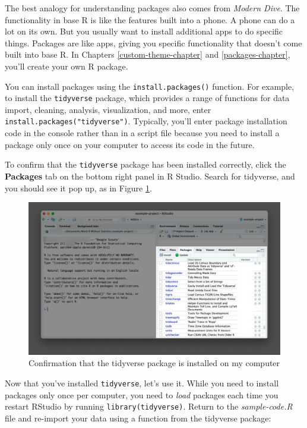 \documentclass[
]{book}
\begin{document}
The best analogy for understanding packages also comes from \emph{Modern Dive}. The functionality in base R is like the features built into a phone. A phone can do a lot on its own. But you usually want to install additional apps to do specific things. Packages are like apps, giving you specific functionality that doesn't come built into base R. In Chapters \ref{custom-theme-chapter} and \ref{packages-chapter}, you'll create your own R package.

You can install packages using the \texttt{install.packages()} function. For example, to install the \texttt{tidyverse} package, which provides a range of functions for data import, cleaning, analysis, visualization, and more, enter \texttt{install.packages("tidyverse")}. Typically, you'll enter package installation code in the console rather than in a script file because you need to install a package only once on your computer to access its code in the future.

To confirm that the \texttt{tidyverse} package has been installed correctly, click the \textbf{Packages} tab on the bottom right panel in R Studio. Search for tidyverse, and you should see it pop up, as in Figure \ref{fig:tidyverse-installed}.

\begin{figure}
\includegraphics[width=1\linewidth]{assets/tidyverse-installed} \caption{Confirmation that the tidyverse package is installed on my computer}\label{fig:tidyverse-installed}
\end{figure}

Now that you've installed \texttt{tidyverse}, let's use it. While you need to install packages only once per computer, you need to \emph{load} packages each time you restart RStudio by running \texttt{library(tidyverse)}. Return to the \emph{sample-code.R} file and re-import your data using a function from the tidyverse package:
\end{document}
